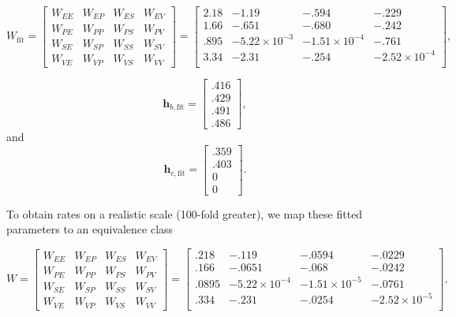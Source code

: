 \documentclass[11pt]{article}
\begin{document}
\begin{equation}
W_{\text{fit}} =  \begin{bmatrix} W_{EE} & W_{EP} & W_{ES} & W_{EV} \\
W_{PE} & W_{PP} & W_{PS} & W_{PV} \\
W_{SE} & W_{SP} & W_{SS} & W_{SV} \\
W_{VE} & W_{VP} & W_{VS} & W_{VV}  \end{bmatrix} = 
 \begin{bmatrix} 2.18 & -1.19 & -.594 & -.229 \\
 1.66 & -.651 & -.680 & -.242 \\
 .895 & -5.22 \times 10^{-3} & -1.51 \times 10^{-4}   & -.761 \\
 3.34 &  -2.31 & -.254  & -2.52 \times 10^{-4} \\
 \end{bmatrix},
\end{equation} 

\begin{equation}
\mathbf{h}_{b,\text{fit}} =
 \begin{bmatrix} .416 \\ .429 \\ .491 \\ .486 \end{bmatrix} ,
\end{equation} 
and
\begin{equation} 
\mathbf{h}_{c,\text{fit}} = 
\begin{bmatrix} .359 \\ .403 \\ 0 \\ 0 \end{bmatrix}.
\end{equation} 

To obtain rates on a realistic scale (100-fold greater), we map these fitted parameters to an equivalence class

\begin{equation}
W =  \begin{bmatrix} W_{EE} & W_{EP} & W_{ES} & W_{EV} \\
W_{PE} & W_{PP} & W_{PS} & W_{PV} \\
W_{SE} & W_{SP} & W_{SS} & W_{SV} \\
W_{VE} & W_{VP} & W_{VS} & W_{VV}  \end{bmatrix} = 
 \begin{bmatrix} .218 & -.119 & -.0594 & -.0229 \\
 .166 & -.0651 & -.068 & -.0242 \\
 .0895 & -5.22 \times 10^{-4} & -1.51 \times 10^{-5}   & -.0761 \\
 .334 &  -.231 & -.0254  & -2.52 \times 10^{-5} \\
 \end{bmatrix},
\end{equation} 
\end{document}
